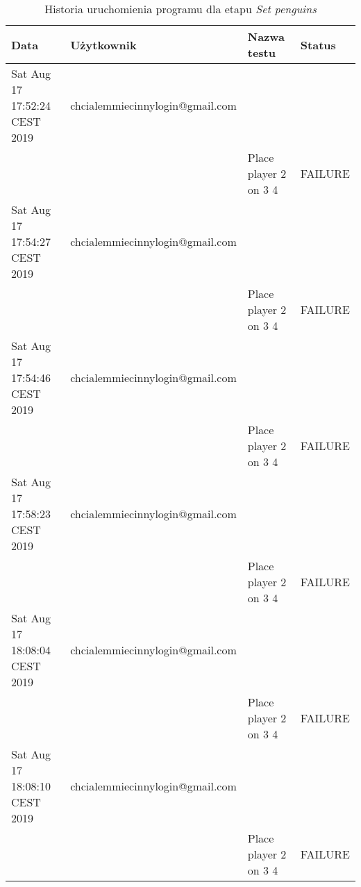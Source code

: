 \scriptsize
\begin{center}
    \begin{longtable}{|l|l|l|l|}
        \caption{Historia uruchomienia programu dla etapu \textit{Set penguins}}
        \label{tab:set_penguins} \\\hline
        \hline
        \rowcolor[HTML]{EFEFEF}
        \textbf{Data}                 & \textbf{Użytkownik}             & \textbf{Nazwa testu}             & \textbf{Status} \\ \hline
        Sat Aug 17 17:52:24 CEST 2019 & chcialemmiecinnylogin@gmail.com &                                  &                 \\ \hline
        &                                 & Place player 2 on 3 4            & FAILURE         \\ \hline
        Sat Aug 17 17:54:27 CEST 2019 & chcialemmiecinnylogin@gmail.com &                                  &                 \\ \hline
        &                                 & Place player 2 on 3 4            & FAILURE         \\ \hline
        Sat Aug 17 17:54:46 CEST 2019 & chcialemmiecinnylogin@gmail.com &                                  &                 \\ \hline
        &                                 & Place player 2 on 3 4            & FAILURE         \\ \hline
        Sat Aug 17 17:58:23 CEST 2019 & chcialemmiecinnylogin@gmail.com &                                  &                 \\ \hline
        &                                 & Place player 2 on 3 4            & FAILURE         \\ \hline
        Sat Aug 17 18:08:04 CEST 2019 & chcialemmiecinnylogin@gmail.com &                                  &                 \\ \hline
        &                                 & Place player 2 on 3 4            & FAILURE         \\ \hline
        Sat Aug 17 18:08:10 CEST 2019 & chcialemmiecinnylogin@gmail.com &                                  &                 \\ \hline
        &                                 & Place player 2 on 3 4            & FAILURE         \\ \hline

\end{longtable}
\end{center}
